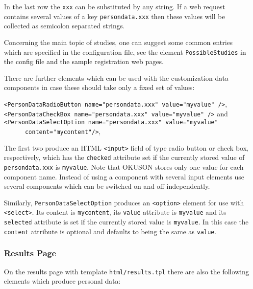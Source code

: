\documentclass[12pt,openany,a4paper]{book}
\newcommand{\OKUSON}{\textsf{OKUSON}}
\begin{document}
In the last row the \texttt{xxx} can be substituted by any string.
If a web request contains several values of a key \texttt{persondata.xxx}
then these values will be collected as semicolon separated strings.

Concerning the main topic of studies, one can suggest some common entries
which are specified in the configuration file, see the element
\texttt{PossibleStudies} in the config file and the sample registration 
web pages.

There are further elements which can be used with the customization data
components in case these should  take only a fixed set of values:

\texttt{<PersonDataRadioButton name="persondata.xxx" value="myvalue" />}, \\ 
\texttt{<PersonDataCheckBox name="persondata.xxx" value="myvalue" />} and \\
\texttt{<PersonDataSelectOption name="persondata.xxx" value="myvalue" }\\
\mbox{}\texttt{~~~~~~content="mycontent"/>},  

The first two produce an HTML \texttt{<input>} field of type  
radio button or check box,
respectively, which has the \texttt{checked} attribute set if the currently
stored value of \texttt{persondata.xxx} is \texttt{myvalue}.
Note that {\OKUSON} stores only one value for
each component name. Instead of using a component with several input
elements use several components which can be switched on and off independently.

Similarly, \texttt{PersonDataSelectOption} produces an \texttt{<option>}
element for use with \texttt{<select>}. Its content is \texttt{mycontent}, its 
\texttt{value} attribute is \texttt{myvalue} and
its \texttt{selected} attribute is set if the currently stored value is
\texttt{myvalue}. In this case the \texttt{content} attribute is optional
and defaults to being the same as \texttt{value}.

\subsubsection*{Results Page}

On the results page with template \texttt{html/results.tpl} there are
also the following elements which produce personal data:
\end{document}
